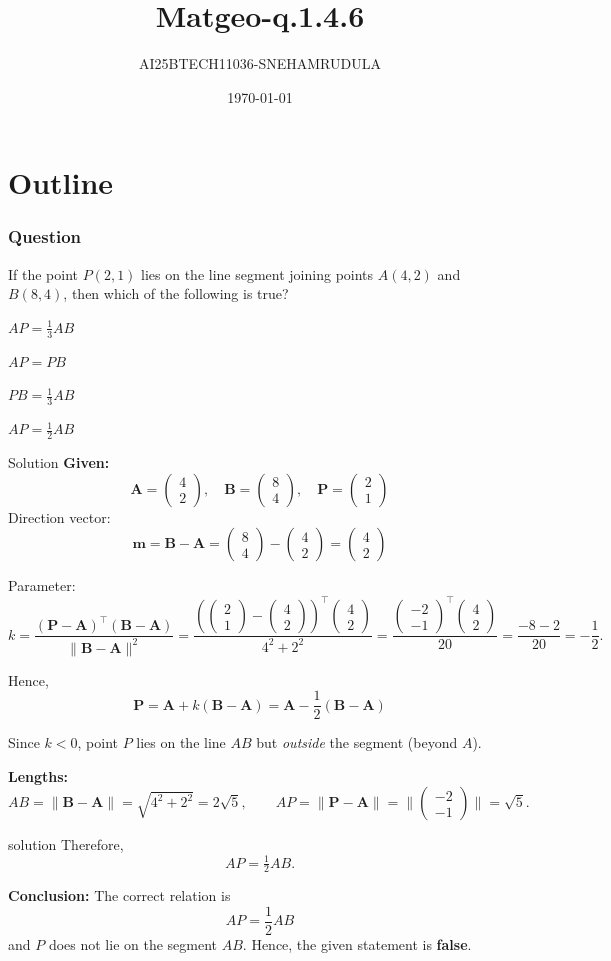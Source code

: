 \documentclass{beamer}
\title{Matgeo-q.1.4.6}
\author{AI25BTECH11036-SNEHAMRUDULA}
\date{\today}
\theoremstyle{remark}
\newcommand{\myvec}[1]{\ensuremath{\begin{pmatrix}#1\end{pmatrix}}}
\let\vec\mathbf
\begin{document}
\begin{frame}
\titlepage
\end{frame}

\section*{Outline}


\begin{frame}
\frametitle{Question}
 If the point $P(2, 1)$ lies on the line segment joining points $A(4, 2)$ and $B(8, 4)$, then which of the following is true?
    \item $AP = \frac{1}{3} AB$
    \item $AP = PB$
    \item $PB = \frac{1}{3} AB$
    \item $AP = \frac{1}{2} AB$

\end{frame}
%
\begin{frame}[t]{Solution}
\small
\textbf{Given:}\;
 \[
    \vec A=\myvec{4\\2},\quad 
    \vec B=\myvec{8\\4},\quad 
    \vec P=\myvec{2\\1}
    \]
    Direction vector:
    \[
    \vec m=\vec B-\vec A=\myvec{8\\4}-\myvec{4\\2}=\myvec{4\\2}
    \]

    Parameter:
    \[
    k=\frac{(\vec P-\vec A)^\top(\vec B-\vec A)}{\|\vec B-\vec A\|^2}
    =\frac{(\myvec{2\\1}-\myvec{4\\2})^\top\myvec{4\\2}}{4^2+2^2}
    =\frac{\myvec{-2\\-1}^\top\myvec{4\\2}}{20}
    =\frac{-8-2}{20}=-\frac{1}{2}.
    \]

    Hence,
    \[
    \vec P=\vec A+k(\vec B-\vec A)=\vec A-\frac{1}{2}(\vec B-\vec A)
    \]

    Since \(k<0\), point \(P\) lies on the line \(AB\) but \emph{outside} the segment (beyond \(A\)).

    \item \textbf{Lengths:}
    \[
    AB=\|\vec B-\vec A\|=\sqrt{4^2+2^2}=2\sqrt{5}, \qquad
    AP=\|\vec P-\vec A\|=\|\myvec{-2\\-1}\|=\sqrt{5}.
    \]
\end{frame}
\begin{frame}{solution}
    Therefore,
    \[
    AP=\tfrac{1}{2}AB.
    \]

    \item \textbf{Conclusion:}  
    The correct relation is
    \[
    AP=\frac{1}{2}AB
    \]
    and \(P\) does not lie on the segment \(AB\).  
    Hence, the given statement is \textbf{false}.
    \end{frame}
\end{document}
